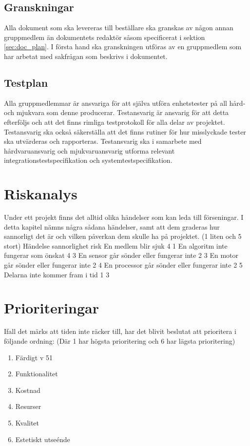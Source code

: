 \documentclass[a4paper,11pt]{article}
\begin{document}
    \subsection{Granskningar}
    Alla dokument som ska levereras till beställare ska granskas av någon annan gruppmedlem än dokumentets redaktör såsom specificerat i sektion \ref{sec:doc_plan}. I första hand ska granskningen utföras av en gruppmedlem som har arbetat med sakfrågan som beskrivs i dokumentet.
    
    \subsection{Testplan}
    Alla gruppmedlemmar är ansvariga för att själva utföra enhetstester på all hård- och mjukvara som denne producerar. Testansvarig är ansvarig för att detta efterföljs och att det finns rimliga testprotokoll för alla delar av projektet. Testansvarig ska också säkerställa att det finns rutiner för hur misslyckade tester ska utvärderas och rapporteras. Testansvarig ska i samarbete med hårdvaruansvarig och mjukvaruansvarig utforma relevant integrationstestspecifikation och systemtestspecifikation.
    
    \section{Riskanalys}
    Under ett projekt finns det alltid olika händelser som kan leda till förseningar. I detta kapitel nämns några sådana händelser, samt att dem graderas hur sannorligt det är och vilken påverkan dem skulle ha på projektet. (1 liten och 5 stort)
    Händelse sannorlighet risk
    En medlem blir sjuk 4 1
    En algoritm inte fungerar som önskat 4 3
    En sensor går sönder eller fungerar inte 2 3
    En motor går sönder eller fungerar inte 2 4
    En processor går sönder eller fungerar inte 2 5
    Delarna inte kommer fram i tid 1 3
    
    
    \section{Prioriteringar}
    Ifall det märks att tiden inte räcker till, har det blivit beslutat att prioritera i följande ordning: (Där 1 har högsta prioritering och 6 har lägsta prioritering)
    
    \begin{enumerate}
        \item Färdigt v 51
        \item Funktionalitet
        \item Kostnad
        \item Resurser
        \item Kvalitet
        \item Estetiskt utseénde
    \end{enumerate}
    
\end{document}
